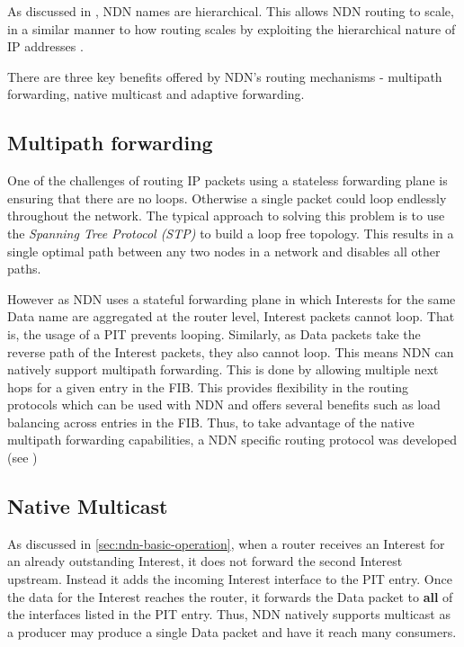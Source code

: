 As discussed in , NDN names are hierarchical. This allows NDN routing to scale, in a similar manner to how routing scales by exploiting the hierarchical nature of IP addresses \cite{stateful-forwarding}.

There are three key benefits offered by NDN's routing mechanisms - multipath forwarding, native multicast and adaptive forwarding.

\subsection*{Multipath forwarding}
One of the challenges of routing IP packets using a stateless forwarding plane is ensuring that there are no loops. Otherwise a single packet could loop endlessly throughout the network. The typical approach to solving this problem is to use the \textit{Spanning Tree Protocol (STP)} \cite{spanning-tree-protocol} to build a loop free topology. This results in a single optimal path between any two nodes in a network and disables all other paths.

However as NDN uses a stateful forwarding plane in which Interests for the same Data name are aggregated at the router level, Interest packets cannot loop. That is, the usage of a PIT prevents looping. Similarly, as Data packets take the reverse path of the Interest packets, they also cannot loop. This means NDN can natively support multipath forwarding. This is done by allowing multiple next hops for a given entry in the FIB. This provides flexibility in the routing protocols which can be used with NDN and offers several benefits such as load balancing across entries in the FIB. Thus, to take advantage of the native multipath forwarding capabilities, a NDN specific routing protocol was developed (see ) 

\subsection*{Native Multicast}
As discussed in \ref{sec:ndn-basic-operation}, when a router receives an Interest for an already outstanding Interest, it does not forward the second Interest upstream. Instead it adds the incoming Interest interface to the PIT entry. Once the data for the Interest reaches the router, it forwards the Data packet to \textbf{all} of the interfaces listed in the PIT entry. Thus, NDN natively supports multicast as a producer may produce a single Data packet and have it reach many consumers. 

